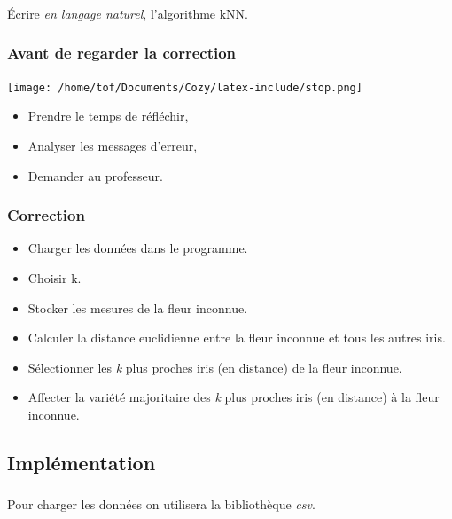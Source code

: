 \documentclass[svgnames,11pt]{beamer}
\begin{document}
\begin{frame}
    \frametitle{}

    \begin{activite}
        Écrire \emph{en langage naturel}, l'algorithme kNN.
        \end{activite}

\end{frame}
\begin{frame}
    \frametitle{Avant de regarder la correction}
\begin{center}
    \centering
    \texttt{[image: /home/tof/Documents/Cozy/latex-include/stop.png]}
    \end{center}
{\Large
    \begin{itemize}
        \item Prendre le temps de réfléchir,
        \item Analyser les messages d'erreur,
        \item Demander au professeur.
    \end{itemize}
}
\end{frame}
\begin{frame}
    \frametitle{Correction}
\begin{itemize}
    \item Charger les données dans le programme.
    \item Choisir k.
    \item Stocker les mesures de la fleur inconnue.
    \item Calculer la distance euclidienne entre la fleur inconnue et tous les autres iris.
    \item Sélectionner les \emph{k} plus proches iris (en distance) de la fleur inconnue.
    \item Affecter la variété majoritaire  des \emph{k} plus proches iris (en distance) à la fleur inconnue.
\end{itemize}
    

\end{frame}
\subsection{Implémentation}
\begin{frame}
    \frametitle{}
Pour charger les données on utilisera la bibliothèque \emph{csv}.

\end{frame}
\end{document}
